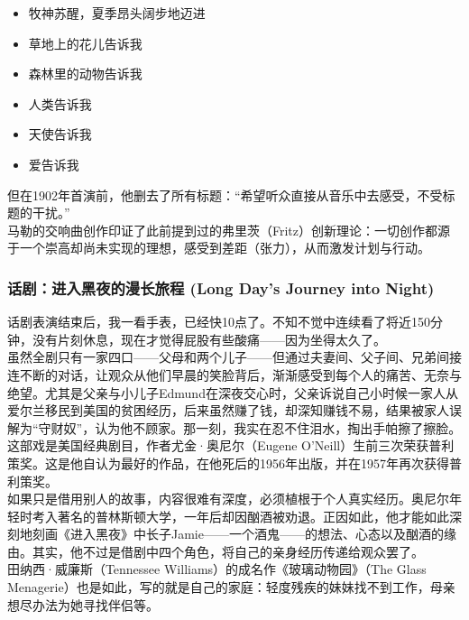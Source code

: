 \begin{itemize}
\tightlist
\item
  牧神苏醒，夏季昂头阔步地迈进
\item
  草地上的花儿告诉我
\item
  森林里的动物告诉我
\item
  人类告诉我
\item
  天使告诉我
\item
  爱告诉我\\
\end{itemize}

但在1902年首演前，他删去了所有标题：``希望听众直接从音乐中去感受，不受标题的干扰。''\\
马勒的交响曲创作印证了此前提到过的弗里茨（Fritz）创新理论：一切创作都源于一个崇高却尚未实现的理想，感受到差距（张力），从而激发计划与行动。\\

\hypertarget{ux8bddux5267ux8fdbux5165ux9ed1ux591cux7684ux6f2bux957fux65c5ux7a0b-long-days-journey-into-night}{%
\subsubsection{话剧：进入黑夜的漫长旅程 (Long Day's Journey into
Night)}\label{ux8bddux5267ux8fdbux5165ux9ed1ux591cux7684ux6f2bux957fux65c5ux7a0b-long-days-journey-into-night}}

话剧表演结束后，我一看手表，已经快10点了。不知不觉中连续看了将近150分钟，没有片刻休息，现在才觉得屁股有些酸痛------因为坐得太久了。\\
虽然全剧只有一家四口------父母和两个儿子------但通过夫妻间、父子间、兄弟间接连不断的对话，让观众从他们早晨的笑脸背后，渐渐感受到每个人的痛苦、无奈与绝望。尤其是父亲与小儿子Edmund在深夜交心时，父亲诉说自己小时候一家人从爱尔兰移民到美国的贫困经历，后来虽然赚了钱，却深知赚钱不易，结果被家人误解为``守财奴''，认为他不顾家。那一刻，我实在忍不住泪水，掏出手帕擦了擦脸。\\
这部戏是美国经典剧目，作者尤金·奥尼尔（Eugene
O'Neill）生前三次荣获普利策奖。这是他自认为最好的作品，在他死后的1956年出版，并在1957年再次获得普利策奖。\\
如果只是借用别人的故事，内容很难有深度，必须植根于个人真实经历。奥尼尔年轻时考入著名的普林斯顿大学，一年后却因酗酒被劝退。正因如此，他才能如此深刻地刻画《进入黑夜》中长子Jamie------一个酒鬼------的想法、心态以及酗酒的缘由。其实，他不过是借剧中四个角色，将自己的亲身经历传递给观众罢了。\\
田纳西·威廉斯（Tennessee Williams）的成名作《玻璃动物园》（The Glass
Menagerie）也是如此，写的就是自己的家庭：轻度残疾的妹妹找不到工作，母亲想尽办法为她寻找伴侣等。

